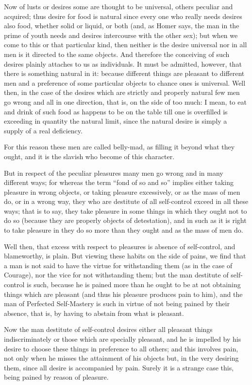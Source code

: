 Now of lusts or desires some are thought to be universal, others peculiar and
acquired; thus desire for food is natural since every one who really needs
desires also food, whether solid or liquid, or both (and, as Homer says, the
man in the prime of youth needs and desires intercourse with the other sex);
but when we come to this or that particular kind, then neither is the desire
universal nor in all men is it directed to the same objects. And therefore the
conceiving of such desires plainly attaches to us as individuals. It must be
admitted, however, that there is something natural in it: because different
things are pleasant to different men and a preference of some particular
objects to chance ones is universal. Well then, in the case of the desires
which are strictly and properly natural few men go wrong and all in one
direction, that is, on the side of too much: I mean, to eat and drink of such
food as happens to be on the table till one is overfilled is exceeding in
quantity the natural limit, since the natural desire is simply a supply of a
real deficiency.

For this reason these men are called belly-mad, as filling it beyond what they
ought, and it is the slavish who become of this character.

But in respect of the peculiar pleasures many men go wrong and in many
different ways; for whereas the term “fond of so and so” implies
either taking pleasure in wrong objects, or taking pleasure excessively, or as
the mass of men do, or in a wrong way, they who are destitute of all
self-control exceed in all these ways; that is to say, they take pleasure in
some things in which they ought not to do so (because they are properly objects
of detestation), and in such as it is right to take pleasure in they do so more
than they ought and as the mass of men do.

Well then, that excess with respect to pleasures is absence of self-control,
and blameworthy, is plain. But viewing these habits on the side of pains, we
find that a man is not said to have the virtue for withstanding them (as in the
case of Courage), nor the vice for not withstanding them; but the man destitute
of self-control is such, because he is pained more than he ought to be at not
obtaining things which are pleasant (and thus his pleasure produces pain to
him), and the man of Perfected Self-Mastery is such in virtue of not being
pained by their absence, that is, by having to abstain from what is pleasant.

Now the man destitute of self-control desires either all pleasant things
indiscriminately or those which are specially pleasant, and he is impelled by
his desire to choose these things in preference to all others; and this
involves pain, not only when he misses the attainment of his objects but, in
the very desiring them, since all desire is accompanied by pain. Surely it is a
strange case this, being pained by reason of pleasure.

